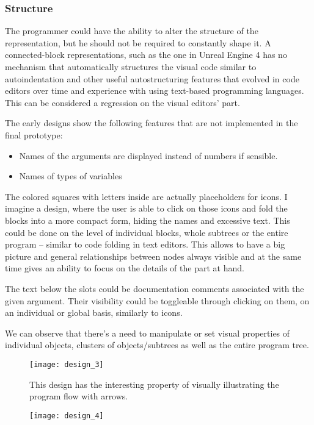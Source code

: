 \subsubsection{Structure}
The programmer could have the ability to alter the structure of the
representation, but he should not be required to constantly shape it. A
connected-block representations, such as the one in Unreal Engine 4 has no
mechanism that automatically structures the visual code similar to
autoindentation and other useful autostructuring features that evolved in code
editors over time and experience with using text-based programming
languages. This can be considered a regression on the visual editors' part.

The early designs show the following features that are not implemented in the
final prototype:
\begin{itemize}
	\item Names of the arguments are displayed instead of numbers if
          sensible.
	\item Names of types of variables
\end{itemize}

The colored squares with letters inside are actually placeholders for icons.  I
imagine a design, where the user is able to click on those icons and fold the
blocks into a more compact form, hiding the names and excessive text. This could
be done on the level of individual blocks, whole subtrees or the entire program
-- similar to code folding in text editors. This allows to have a big picture
and general relationships between nodes always visible and at the same time
gives an ability to focus on the details of the part at hand.

The text below the slots could be documentation comments associated with the
given argument. Their visibility could be toggleable through clicking on them,
on an individual or global basis, similarly to icons.

We can observe that there's a need to manipulate or set visual properties of
individual objects, clusters of objects/subtrees as well as the entire program
tree.


\begin{figure}[h!]
\centering \texttt{[image: design\_3]}
\caption{This design has the interesting property of visually illustrating the
  program flow with arrows.}
\label{fig:design_3}
\end{figure}


\begin{figure}[h!]
\centering \texttt{[image: design\_4]}
\caption{}
\label{fig:design_4}
\end{figure}

